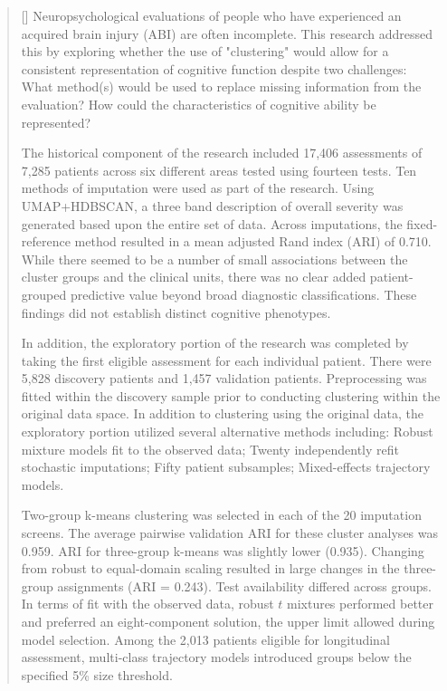 \documentclass[
11pt, %
english, %
onehalfspacing, %
headsepline, %
]{MastersDoctoralThesis} %
\begin{document}

\begin{abstract}[]
\addchaptertocentry{\abstractname}
Neuropsychological evaluations of people who have experienced an acquired brain injury (ABI) are often incomplete. This research addressed this by exploring whether the use of "clustering" would allow for a consistent representation of cognitive function despite two challenges: What method(s) would be used to replace missing information from the evaluation? How could the characteristics of cognitive ability be represented?

The historical component of the research included 17,406 assessments of 7,285 patients across six different areas tested using fourteen tests. Ten methods of imputation were used as part of the research. Using UMAP+HDBSCAN, a three band description of overall severity was generated based upon the entire set of data. Across imputations, the fixed-reference method resulted in a mean adjusted Rand index (ARI) of 0.710. While there seemed to be a number of small associations between the cluster groups and the clinical units, there was no clear added patient-grouped predictive value beyond broad diagnostic classifications. These findings did not establish distinct cognitive phenotypes.

In addition, the exploratory portion of the research was completed by taking the first eligible assessment for each individual patient. There were 5,828 discovery patients and 1,457 validation patients. Preprocessing was fitted within the discovery sample prior to conducting clustering within the original data space. In addition to clustering using the original data, the exploratory portion utilized several alternative methods including: Robust mixture models fit to the observed data; Twenty independently refit stochastic imputations; Fifty patient subsamples; Mixed-effects trajectory models.

Two-group k-means clustering was selected in each of the 20 imputation screens. The average pairwise validation ARI for these cluster analyses was 0.959. ARI for three-group k-means was slightly lower (0.935). Changing from robust to equal-domain scaling resulted in large changes in the three-group assignments (ARI = 0.243). Test availability differed across groups. In terms of fit with the observed data, robust $t$ mixtures performed better and preferred an eight-component solution, the upper limit allowed during model selection. Among the 2,013 patients eligible for longitudinal assessment, multi-class trajectory models introduced groups below the specified 5\% size threshold.


\end{abstract}
\end{document}
